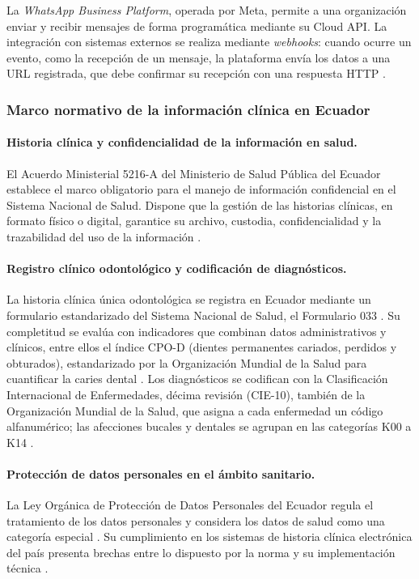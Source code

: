 La \textit{WhatsApp Business Platform}, operada por Meta, permite a una organización
enviar y recibir mensajes de forma programática mediante su Cloud API. La integración
con sistemas externos se realiza mediante \textit{webhooks}: cuando ocurre un evento,
como la recepción de un mensaje, la plataforma envía los datos a una URL registrada,
que debe confirmar su recepción con una respuesta HTTP \cite{meta2026whatsapp}.

\subsubsection{Marco normativo de la información clínica en Ecuador}

\paragraph{Historia clínica y confidencialidad de la información en salud.}

El Acuerdo Ministerial 5216-A del Ministerio de Salud Pública del Ecuador establece
el marco obligatorio para el manejo de información confidencial en el Sistema
Nacional de Salud. Dispone que la gestión de las historias clínicas, en formato
físico o digital, garantice su archivo, custodia, confidencialidad y la trazabilidad
del uso de la información \cite{msp5216a}.

\paragraph{Registro clínico odontológico y codificación de diagnósticos.}

La historia clínica única odontológica se registra en Ecuador mediante un formulario
estandarizado del Sistema Nacional de Salud, el Formulario 033 \cite{msp5216a}. Su
completitud se evalúa con indicadores que combinan datos administrativos y clínicos,
entre ellos el índice CPO-D (dientes permanentes cariados, perdidos y obturados),
estandarizado por la Organización Mundial de la Salud para cuantificar la caries
dental \cite{who2013oralhealth}. Los diagnósticos se codifican con la Clasificación
Internacional de Enfermedades, décima revisión (CIE-10), también de la Organización
Mundial de la Salud, que asigna a cada enfermedad un código alfanumérico; las
afecciones bucales y dentales se agrupan en las categorías K00 a K14
\cite{who2019icd10}.

\paragraph{Protección de datos personales en el ámbito sanitario.}

La Ley Orgánica de Protección de Datos Personales del Ecuador regula el tratamiento
de los datos personales y considera los datos de salud como una categoría especial
\cite{lopdp2021}. Su cumplimiento en los sistemas de historia clínica electrónica del
país presenta brechas entre lo dispuesto por la norma y su implementación técnica
\cite{martinez2022proteccion}.
